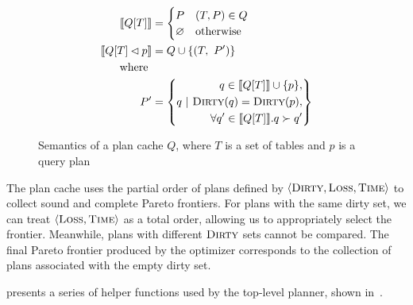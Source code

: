 \begin{figure}
  \begin{align*}
    \llbracket Q[T] \rrbracket &= \begin{cases}
      P & (T, P) \in Q \\
      \varnothing & \text{otherwise} \\
    \end{cases} \\
    \llbracket Q[T] \lhd p \rrbracket &= \begin{aligned} Q \cup \{(T,\ P') \} \end{aligned}\\
                                            \text{ where } \\
                                           P' &= \left\{q ~|~ \begin{aligned}
                                                                     q \in \llbracket Q[T] \rrbracket \cup \{p\}, \\
                                                                     \textsc{Dirty}(q) = \textsc{Dirty}(p),\\
                                                                     \forall q' \in \llbracket Q[T] \rrbracket.  q \succ q' 
                                                                   \end{aligned}
                                           \right\}
  \end{align*}
  \caption{Semantics of a plan cache $Q$, where $T$ is a set of tables and $p$ is a query plan}
  \label{fig:semantics-plan-cache}
\end{figure}

The plan cache uses the partial order of plans defined by  $\langle \textsc{Dirty}, \textsc{Loss}, \textsc{Time} \rangle$ to
collect sound and complete Pareto frontiers. For plans with the same dirty set, we can treat $\langle \textsc{Loss}, \textsc{Time} \rangle$
as a total order, allowing us to appropriately select the frontier. Meanwhile, plans with different $\textsc{Dirty}$ sets cannot be compared. The final
Pareto frontier produced by the optimizer corresponds to the collection of plans associated with the empty dirty set.

 presents a series of helper functions used by the top-level planner, shown in~.

